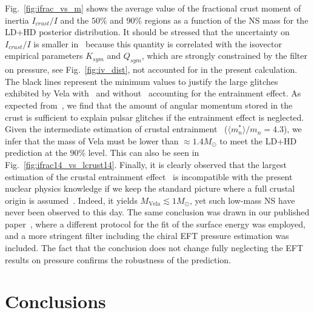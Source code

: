 Fig.~\ref{fig:ifrac_vs_m} shows the average value of the fractional crust 
moment of inertia $I_{crust}/I$ and the $50\%$ and $90\%$ regions 
as a function of the NS mass for the LD+HD posterior distribution. It should be
stressed that the uncertainty on $I_{crust}/I$ is smaller 
in~\cite{Carreau2019moi} because this quantity is correlated with the 
isovector empirical parameters $K_{sym}$ and $Q_{sym}$, which are strongly
constrained by the filter on pressure, see Fig.~\ref{fig:iv_dist}, not
accounted for in the present calculation. The black
lines represent the minimum values to justify the large glitches exhibited by
Vela with~\cite{Delsate2016,Andersson2012} and without~\cite{Link1999} 
accounting for the entrainment effect. As expected from~\cite{Link1999}, we
find that the amount of angular momentum stored in the crust is sufficient to
explain pulsar glitches if the entrainment effect is neglected.
Given the intermediate estimation of crustal entrainment~\cite{Andersson2012}
($\langle m_n^*\rangle/m_n = 4.3$), we infer that the mass of Vela must be
lower than $\approx 1.4M_\odot$ to meet the LD+HD prediction at the $90\%$
level. This can also be seen in Fig.~\ref{fig:ifrac14_vs_lcrust14}.
Finally, it is clearly observed that the largest estimation of the crustal 
entrainment effect~\cite{Delsate2016} is incompatible with the present nuclear 
physics knowledge if we keep the standard picture where a full crustal origin 
is assumed~\cite{Anderson1975}. Indeed, it yields $M_\text{Vela} \lesssim 
1M_\odot$, yet such low-mass NS have never been observed to this day. 
%
The same conclusion was drawn in our published paper~\cite{Carreau2019moi}, 
where a different protocol for the fit of the surface energy was employed, and 
a more stringent filter including the chiral EFT pressure estimation was 
included. The fact that the conclusion does not change fully neglecting the EFT 
results on pressure confirms the robustness of the prediction.

\section{Conclusions}\label{sec:conclu2}

